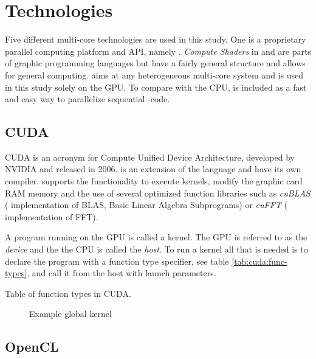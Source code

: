 \chapter{Technologies}

\newcommand{\procwidth}{{\textwidth * 3 / 4}}

Five different multi-core technologies are used in this study. One is a proprietary parallel computing platform and API, namely {\CU}. \textit{Compute Shaders} in {\GL} and {\DX} are parts of graphic programming languages but have a fairly general structure and allows for general computing. {\OCL} aims at any heterogeneous multi-core system and is used in this study solely on the GPU. To compare with the CPU, {\OMP} is included as a fast and easy way to parallelize sequential {\CPP} -code.

\section{CUDA}

CUDA is an acronym for Compute Unified Device Architecture, developed by NVIDIA and released in 2006. {\CU} is an extension of the {\CPP} language and have its own compiler. {\CU} supports the functionality to execute kernels, modify the graphic card RAM memory and the use of several optimized function libraries such as \textit{cuBLAS} ({\CU} implementation of BLAS, Basic Linear Algebra Subprograms) or \textit{cuFFT} ({\CU} implementation of FFT).

A program running on the GPU is called a kernel. The GPU is referred to as the \textit{device} and the the CPU is called the \textit{host}. To run a {\CU} kernel all that is needed is to declare the program with a function type specifier, see table \ref{tab:cuda:func-types}, and call it from the host with launch parameters.

\begin{table}
	\centering
	
	\caption{Table of function types in CUDA.}
	\label{tab:cuda:func-types}
\end{table}

\begin{figure}
	\centering
	\fbox{}
	\caption{Example {\CU} global kernel}
	\label{lst:sample:global:cu}	
\end{figure}

\section{OpenCL}

